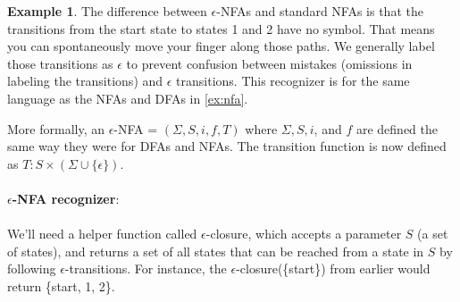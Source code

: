 \documentclass[]{article}
\theoremstyle{definition}
\newtheorem{ex}{Example}[section]
\begin{document}
\begin{ex}
				The difference between $\epsilon$-NFAs and standard NFAs is that the transitions from the start state to states 1 and 2 have no symbol. That means you can spontaneously move your finger along those paths. We generally label those transitions as $\epsilon$ to prevent confusion between mistakes (omissions in labeling the transitions) and $\epsilon$ transitions. This recognizer is for the same language as the NFAs and DFAs in \ref{ex:nfa}.
			\end{ex}

			More formally, an $\epsilon$-NFA = $(\Sigma, S, i, f, T)$ where $\Sigma, S, i$, and $f$ are defined the same way they were for DFAs and NFAs. The transition function is now defined as $T: S \times (\Sigma \cup \{ \epsilon \} )$.
			\\ \\
			\textbf{$\epsilon$-NFA recognizer}:
			\\ \\
			We'll need a helper function called $\epsilon$-closure, which accepts a parameter $S$ (a set of states), and returns a set of all states that can be reached from a state in $S$ by following $\epsilon$-transitions. For instance, the $\epsilon$-closure(\{start\}) from earlier would return \{start, 1, 2\}.
\end{document}
